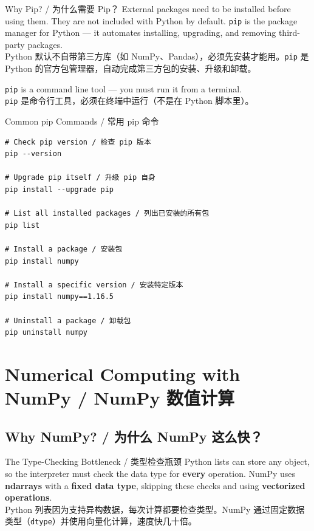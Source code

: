\documentclass[11pt,a4paper]{report}
\let\oldtexttt\texttt
\renewcommand{\texttt}[1]{\textcolor{mainblue}{\oldtexttt{#1}}}
\begin{document}
\begin{concept}{Why Pip? / 为什么需要 Pip？}
    External packages need to be installed before using them. They are not included with Python by default. \texttt{pip} is the package manager for Python — it automates installing, upgrading, and removing third-party packages. \\
    Python 默认不自带第三方库（如 NumPy、Pandas），必须先安装才能用。\texttt{pip} 是 Python 的官方包管理器，自动完成第三方包的安装、升级和卸载。

    \texttt{pip} is a command line tool — you must run it from a terminal. \\
    \texttt{pip} 是命令行工具，必须在终端中运行（不是在 Python 脚本里）。
\end{concept}

\begin{examplebox}{Common pip Commands / 常用 pip 命令}
\begin{lstlisting}
# Check pip version / 检查 pip 版本
pip --version

# Upgrade pip itself / 升级 pip 自身
pip install --upgrade pip

# List all installed packages / 列出已安装的所有包
pip list

# Install a package / 安装包
pip install numpy

# Install a specific version / 安装特定版本
pip install numpy==1.16.5

# Uninstall a package / 卸载包
pip uninstall numpy
\end{lstlisting}
\end{examplebox}

\section{Numerical Computing with NumPy / NumPy 数值计算}

\subsection{Why NumPy? / 为什么 NumPy 这么快？}

\begin{concept}{The Type-Checking Bottleneck / 类型检查瓶颈}
    Python lists can store any object, so the interpreter must check the data type for \textbf{every} operation. NumPy uses \textbf{ndarrays} with a \textbf{fixed data type}, skipping these checks and using \textbf{vectorized operations}. \\
    Python 列表因为支持异构数据，每次计算都要检查类型。NumPy 通过固定数据类型（\texttt{dtype}）并使用向量化计算，速度快几十倍。
\end{concept}
\end{document}
